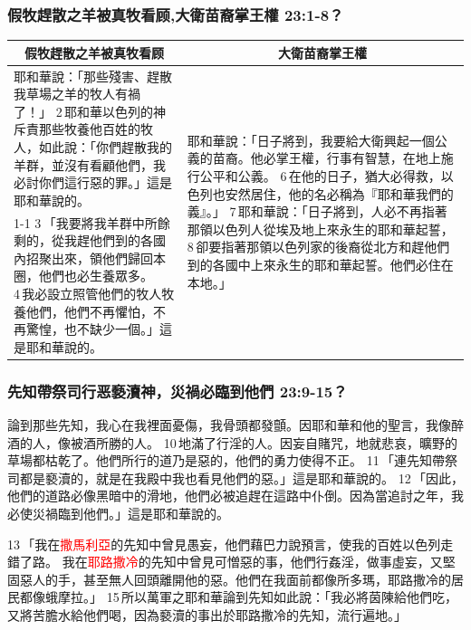 \subsubsection{假牧趕散之羊被真牧看顾,大衛苗裔掌王權 23:1-8？}
\begin{table}[H]
\centering
\begin{tabular}{p{8.5cm}|p{8.5cm}}\hline\hline
\multicolumn{1}{c|}{假牧趕散之羊被真牧看顾}&\multicolumn{1}{c}{大衛苗裔掌王權}\\\hline
耶和華說：「那些殘害、趕散我草場之羊的牧人有禍了！」 2 耶和華以色列的神斥責那些牧養他百姓的牧人，如此說：「你們趕散我的羊群，並沒有看顧他們，我必討你們這行惡的罪。」這是耶和華說的。
&\multirow{2}{8.76cm}{耶和華說：「日子將到，我要給大衛興起一個公義的苗裔。他必掌王權，行事有智慧，在地上施行公平和公義。 6 在他的日子，猶大必得救，以色列也安然居住，他的名必稱為『耶和華我們的義』。」 7 耶和華說：「日子將到，人必不再指著那領以色列人從埃及地上來永生的耶和華起誓， 8 卻要指著那領以色列家的後裔從北方和趕他們到的各國中上來永生的耶和華起誓。他們必住在本地。」}\\\cline{1-1}
3 「我要將我羊群中所餘剩的，從我趕他們到的各國內招聚出來，領他們歸回本圈，他們也必生養眾多。 4 我必設立照管他們的牧人牧養他們，他們不再懼怕，不再驚惶，也不缺少一個。」這是耶和華說的。&\\\hline
\end{tabular}
\end{table}

\subsubsection{先知帶祭司行恶褻瀆神，災禍必臨到他們 23:9-15？}
論到那些先知，我心在我裡面憂傷，我骨頭都發顫。因耶和華和他的聖言，我像醉酒的人，像被酒所勝的人。 10 地滿了行淫的人。因妄自賭咒，地就悲哀，曠野的草場都枯乾了。他們所行的道乃是惡的，他們的勇力使得不正。 11 「連先知帶祭司都是褻瀆的，就是在我殿中我也看見他們的惡。」這是耶和華說的。 12 「因此，他們的道路必像黑暗中的滑地，他們必被追趕在這路中仆倒。因為當追討之年，我必使災禍臨到他們。」這是耶和華說的。

13 「我在\textcolor{red}{撒馬利亞}的先知中曾見愚妄，他們藉巴力說預言，使我的百姓以色列走錯了路。 
我在\textcolor{red}{耶路撒冷}的先知中曾見可憎惡的事，他們行姦淫，做事虛妄，又堅固惡人的手，甚至無人回頭離開他的惡。他們在我面前都像所多瑪，耶路撒冷的居民都像蛾摩拉。」 15 所以萬軍之耶和華論到先知如此說：「我必將茵陳給他們吃，又將苦膽水給他們喝，因為褻瀆的事出於耶路撒冷的先知，流行遍地。」


